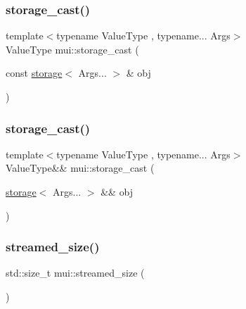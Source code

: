 \mbox{\label{namespacemui_a5cf84b0135c75c6adcc2edbb501fa2f4}} 
\subsubsection{\texorpdfstring{storage\+\_\+cast()}{storage\_cast()}\hspace{0.1cm}{\footnotesize\ttfamily [4/5]}}
{\footnotesize\ttfamily template$<$typename Value\+Type , typename... Args$>$ \\
Value\+Type mui\+::storage\+\_\+cast (\begin{DoxyParamCaption}\item[{const \hyperlink{structmui_1_1storage}{storage}$<$ Args... $>$ \&}]{obj }\end{DoxyParamCaption})}

\mbox{\label{namespacemui_a14f2617b6b44b2b34377eb403f0195b1}} 
\subsubsection{\texorpdfstring{storage\+\_\+cast()}{storage\_cast()}\hspace{0.1cm}{\footnotesize\ttfamily [5/5]}}
{\footnotesize\ttfamily template$<$typename Value\+Type , typename... Args$>$ \\
Value\+Type\&\& mui\+::storage\+\_\+cast (\begin{DoxyParamCaption}\item[{\hyperlink{structmui_1_1storage}{storage}$<$ Args... $>$ \&\&}]{obj }\end{DoxyParamCaption})\hspace{0.3cm}{\ttfamily [inline]}}

\mbox{\label{namespacemui_ab958b0ec3aa4551fe288f254ef9b1c12}} 
\subsubsection{\texorpdfstring{streamed\+\_\+size()}{streamed\_size()}\hspace{0.1cm}{\footnotesize\ttfamily [1/2]}}
{\footnotesize\ttfamily std\+::size\+\_\+t mui\+::streamed\+\_\+size (\begin{DoxyParamCaption}{ }\end{DoxyParamCaption})\hspace{0.3cm}{\ttfamily [inline]}}

